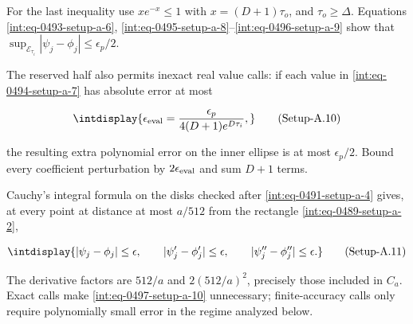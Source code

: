 
For the last inequality use \(x e^{-x}\le1\) with \(x=(D+1)\tau_o\), and \(\tau_o\ge\Delta\). Equations \hyperref[int:eq-setup-a-6]{\eqref{int:eq-0493-setup-a-6}}, \hyperref[int:eq-setup-a-8]{\eqref{int:eq-0495-setup-a-8}}--\allowbreak \hyperref[int:eq-setup-a-9]{\eqref{int:eq-0496-setup-a-9}} show that \(\sup_{\mathcal E_{\tau_i}}|\psi_j-\phi_j|\le\epsilon_p/2\).



The reserved half also permits inexact real value calls: if each value in \hyperref[int:eq-setup-a-7]{\eqref{int:eq-0494-setup-a-7}} has absolute error at most


\label{int:eq-setup-a-10}
\begingroup\renewcommand{\theHequation}{intdisplay.973}
\begin{equation}
\intdisplay{
\epsilon_{\rm eval}=
\frac{\epsilon_p}{4(D+1)e^{D\tau_i}},
}
\tag{Setup-A.10}
\label{int:eq-0497-setup-a-10}
\end{equation}
\endgroup


the resulting extra polynomial error on the inner ellipse is at most \(\epsilon_p/2\). Bound every coefficient perturbation by \(2\epsilon_{\rm eval}\) and sum \(D+1\) terms.



Cauchy's integral formula on the disks checked after \hyperref[int:eq-setup-a-4]{\eqref{int:eq-0491-setup-a-4}} gives, at every point at distance at most \(a/512\) from the rectangle \hyperref[int:eq-setup-a-2]{\eqref{int:eq-0489-setup-a-2}},


\label{int:eq-setup-a-11}
\begingroup\renewcommand{\theHequation}{intdisplay.974}
\begin{equation}
\intdisplay{
|\psi_j-\phi_j|\le\epsilon,\qquad
|\psi_j'-\phi_j'|\le\epsilon,\qquad
|\psi_j''-\phi_j''|\le\epsilon.
}
\tag{Setup-A.11}
\label{int:eq-0498-setup-a-11}
\end{equation}
\endgroup


The derivative factors are \(512/a\) and \(2(512/a)^2\), precisely those included in \(C_a\). Exact calls make \hyperref[int:eq-setup-a-10]{\eqref{int:eq-0497-setup-a-10}} unnecessary; finite-accuracy calls only require polynomially small error in the regime analyzed below.


